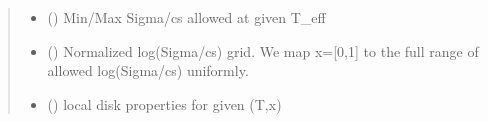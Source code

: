 \documentclass[a4paper,11pt,english]{sphinxmanual}
\begin{document}
\begin{fulllineitems}
\begin{quote}
\begin{description}
\begin{itemize}
\item {} 
\sphinxAtStartPar
{} () \textendash{} Min/Max Sigma/cs allowed at given T\_eff

\item {} 
\sphinxAtStartPar
{} () \textendash{} Normalized log(Sigma/cs) grid.
We map x={[}0,1{]} to the full range of allowed log(Sigma/cs)
uniformly.

\item {} 
\sphinxAtStartPar
{} () \textendash{} local disk properties
for given (T,x)

\end{itemize}


\end{description}\end{quote}

\end{fulllineitems}

\end{document}
